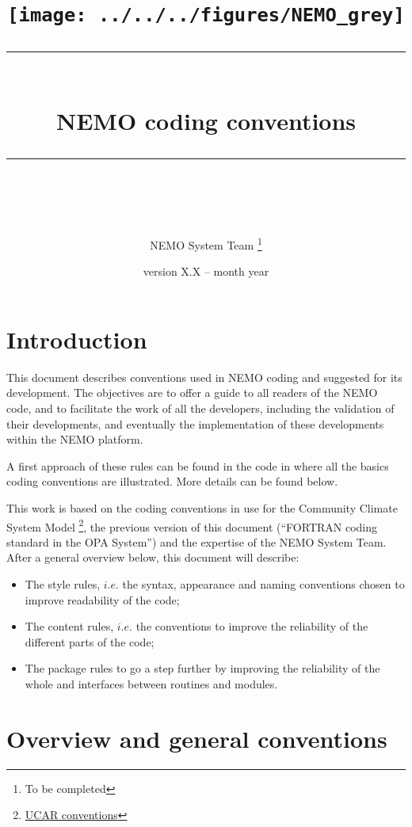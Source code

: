 \documentclass{article}
\title{
  \texttt{[image: ../../../figures/NEMO\_grey]} \\
  \vspace{1.0cm} \rule{345pt}{1.5pt} \\
  \vspace{0.45cm} {\Huge NEMO coding conventions} \rule{345pt}{1.5pt} \\
}
\author{\Large NEMO System Team
  \thanks{
    To be completed
  }
}
\date{version X.X -- month year}
\begin{document}
\maketitle

\newpage

\tableofcontents

\newpage

\section{Introduction}

This document describes conventions used in NEMO coding and suggested for its development.
The objectives are to offer a guide to all readers of the NEMO code, and to facilitate the work of
all the developers, including the validation of their developments, and
eventually the implementation of these developments within the NEMO platform.

A first approach of these rules can be found in the code in  where
all the basics coding conventions are illustrated.
More details can be found below.

This work is based on the coding conventions in use for the Community Climate System Model
\footnote {\href{http://www.cesm.ucar.edu/working_groups/Software/dev_guide/dev_guide/node7.html}{UCAR conventions}}, 
the previous version of this document (``FORTRAN coding standard in the OPA System'') and
the expertise of the NEMO System Team.
After a general overview below, this document will describe:

\begin{itemize}
\item
  The style rules, $i.e.$ the syntax, appearance and naming conventions chosen to improve readability of the code;
\item
  The content rules, $i.e.$ the conventions to improve the reliability of the different parts of the code;
\item
  The package rules to go a step further by improving the reliability of the whole and
  interfaces between routines and modules.
\end{itemize}

\section{Overview and general conventions}
\end{document}
